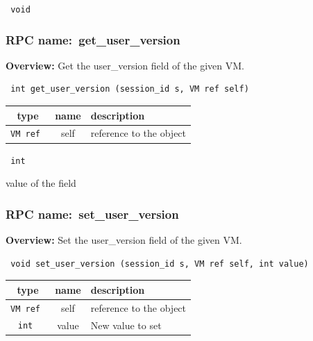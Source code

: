 \vspace{0.3cm}

{\tt 
void
}



\vspace{0.3cm}
\vspace{0.3cm}
\vspace{0.3cm}
\subsubsection{RPC name:~get\_user\_version}

{\bf Overview:} 
Get the user\_version field of the given VM.

\begin{verbatim} int get_user_version (session_id s, VM ref self)\end{verbatim}



 
\vspace{0.3cm}
\begin{tabular}{|c|c|p{7cm}|}
 \hline
{\bf type} & {\bf name} & {\bf description} \\ \hline
{\tt VM ref } & self & reference to the object \\ \hline 

\end{tabular}

\vspace{0.3cm}

{\tt 
int
}


value of the field
\vspace{0.3cm}
\vspace{0.3cm}
\vspace{0.3cm}
\subsubsection{RPC name:~set\_user\_version}

{\bf Overview:} 
Set the user\_version field of the given VM.

\begin{verbatim} void set_user_version (session_id s, VM ref self, int value)\end{verbatim}



 
\vspace{0.3cm}
\begin{tabular}{|c|c|p{7cm}|}
 \hline
{\bf type} & {\bf name} & {\bf description} \\ \hline
{\tt VM ref } & self & reference to the object \\ \hline 

{\tt int } & value & New value to set \\ \hline 

\end{tabular}

